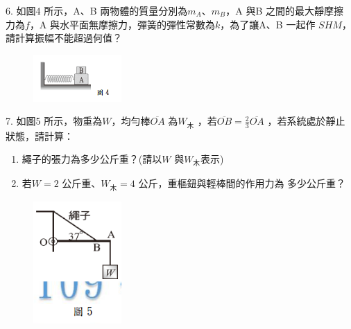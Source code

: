 \documentclass[cn,10pt,math=newtx]{elegantbook}
\begin{document}
\newpage


\begin{example}
   6. 如圖4 所示，A、B 兩物體的質量分別為$m_A、m_B$，A 與B 之間的最大靜摩擦
力為$f$，A 與水平面無摩擦力，彈簧的彈性常數為$k$，為了讓A、B 一起作
$SHM$，請計算振幅不能超過何值？\\
    \rightline{[高雄聯招教甄109]}
\end{example}
\begin{solution}
    
\end{solution}
\begin{figure}[htbp]
    \flushright
    \includegraphics[width=0.3\textwidth]{image/109高雄6.png}
  \end{figure}
\newpage

\begin{example}
   7. 如圖5 所示，物重為$W$，均勻棒$\overline{OA}$ 為$W_木$  ，若$\overline{OB}=\frac{2}{3} \overline{OA}$ ，若系統處於靜止
狀態，請計算：
\begin{enumerate}[label=(\arabic*)] 
  \item 繩子的張力為多少公斤重？(請以$W$ 與$W_木$表示)
  \item 若$W=2$ 公斤重、$W_木=4$ 公斤，重樞鈕與輕棒間的作用力為
多少公斤重？
    \end{enumerate}


    \rightline{[高雄聯招教甄109]}
\end{example}
\begin{solution}
    
\end{solution}
\begin{figure}[htbp]
    \flushright
    \includegraphics[width=0.3\textwidth]{image/109高雄7.png}
  \end{figure}
\newpage
\end{document}
